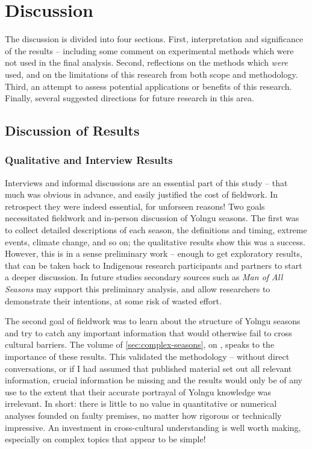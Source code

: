 \chapter{Discussion}
\label{ch:discussion}

The discussion is divided into four sections.  First, interpretation and
significance of the results -- including some comment on experimental methods
which were not used in the final analysis.  Second, reflections on the methods
which \emph{were} used, and on the limitations of this research from both
scope and methodology.  Third, an attempt to assess potential applications or
benefits of this research.  Finally, several suggested directions for future
research in this area.



\section{Discussion of Results}
\label{sec:disc-results}

\subsection{Qualitative and Interview Results}

Interviews and informal discussions are an essential part of this study --
that much was obvious in advance, and easily justified the cost of fieldwork.
In retrospect they were indeed essential, for unforseen reasons!
%
Two goals necessitated fieldwork and in-person discussion of Yolngu seasons.
The first was to collect detailed descriptions of each season, the definitions
and timing, extreme events, climate change, and so on; the qualitative results
show this was a success.  However, this is in a sense preliminary work --
enough to get exploratory results, that can be taken back to Indigenous
research participants and partners to start a deeper discussion.  In future
studies secondary sources such as \textit{Man of All Seasons} \citep{davis1989}
may support this preliminary analysis, and allow researchers to demonstrate
their intentions, at some risk of wasted effort.

The second goal of fieldwork  was to learn about the structure of Yolngu
seasons and try to catch any important information that would otherwise
fail to cross cultural barriers.  The volume of \cref{sec:complex-seasons},
on \textit{}, speaks to the importance of these
results.
%
This validated the methodology -- without direct conversations, or if I had
assumed that published material set out all relevant information, crucial
information be missing and the results would only be of any use to the extent
that their accurate portrayal of Yolngu knowledge was irrelevant.
%
In short: there is little to no value in quantitative or numerical analyses
founded on faulty premises, no matter how rigorous or technically impressive.
An investment in cross-cultural understanding is well worth making, especially
on complex topics that appear to be simple!


